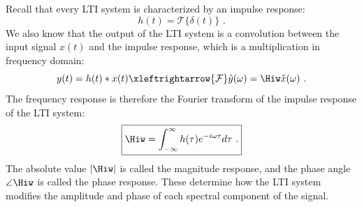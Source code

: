 Recall that every LTI system is characterized by an impulse response:
\begin{equation}
h(t) = \mathcal{T}\{\delta(t)\}\,\,.
\end{equation}
We also know that the output of the LTI system is a convolution between the input signal $x(t)$ and the impulse response, which is a multiplication in frequency domain:
\begin{equation}
y(t) = h(t)*x(t) \xleftrightarrow{\mathcal{F}} \hat{y}(\omega) = \Hiw \hat{x}(\omega)\,\,.
\end{equation}
The frequency response is therefore the Fourier transform of the impulse response of the LTI system:
\begin{equation}
\boxed{
\Hiw = \int_{-\infty}^{\infty} h(\tau)e^{-i\omega \tau}  d\tau\,\,.
}
\end{equation}
The absolute value $|\Hiw|$ is called the  magnitude response, and the phase angle $\angle \Hiw$ is called the  phase response. These determine how the LTI system modifies the amplitude and phase of each spectral component of the signal.
